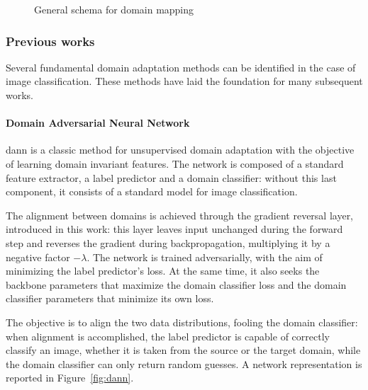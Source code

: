 \documentclass[%
    corpo=12pt,
    twoside,
    stile=classica,   
    tipotesi=magistrale,
    evenboxes,
    english,
	numerazioneromana,
]{toptesi}
\begin{document}
\begin{figure}[ht]
	\centering
	\caption{General schema for domain mapping\cite{wilson2020survey}}
	\label{fig:gan}
\end{figure}

\subsubsection{Previous works}
Several fundamental domain adaptation methods can be identified in the case of image classification. These methods have laid the foundation for many subsequent works.

\paragraph{Domain Adversarial Neural Network}\label{sec:dann}
\gls{dann}\cite{ganin2015unsupervised} is a classic method for unsupervised domain adaptation with the objective of learning domain invariant features. The network is composed of a standard feature extractor, a label predictor and a domain classifier: without this last component, it consists of a standard model for image classification.

The alignment between domains is achieved through the gradient reversal layer, introduced in this work: this layer leaves input unchanged during the forward step and reverses the gradient during backpropagation, multiplying it by a negative factor $-\lambda$. The network is trained adversarially, with the aim of minimizing the label predictor’s loss. 
At the same time, it also seeks the backbone parameters that maximize the domain classifier loss and the domain classifier parameters that minimize its own loss.

The objective is to align the two data distributions, fooling the domain classifier: when alignment is accomplished, the label predictor is capable of correctly classify an image, whether it is taken from the source or the target domain, while the domain classifier can only return random guesses. A network representation is reported in Figure~\ref{fig:dann}.
\end{document}
